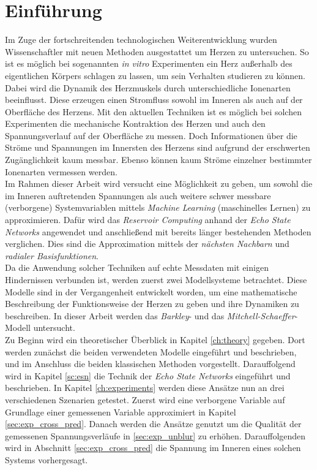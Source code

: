 \chapter{Einführung}



Im Zuge der fortschreitenden technologischen Weiterentwicklung wurden Wissenschaftler mit neuen Methoden ausgestattet um Herzen zu untersuchen. So ist es möglich bei sogenannten \textit{in vitro} Experimenten ein Herz außerhalb des eigentlichen Körpers schlagen zu lassen, um sein Verhalten studieren zu können. Dabei wird die Dynamik des Herzmuskels durch unterschiedliche Ionenarten beeinflusst. Diese erzeugen einen Stromfluss sowohl im Inneren als auch auf der Oberfläche des Herzens. Mit den aktuellen Techniken ist es möglich bei solchen Experimenten die mechanische Kontraktion des Herzen und auch den Spannungsverlauf auf der Oberfläche zu messen. Doch Informationen über die Ströme und Spannungen im Innersten des Herzens sind aufgrund der erschwerten Zugänglichkeit kaum messbar. Ebenso können kaum Ströme einzelner bestimmter Ionenarten vermessen werden. \\

Im Rahmen dieser Arbeit wird versucht eine Möglichkeit zu geben, um sowohl die im Inneren auftretenden Spannungen als auch weitere schwer messbare (verborgene) Systemvariablen mittels \textit{Machine Learning} (maschinelles Lernen) zu approximieren. Dafür wird das \textit{Reservoir Computing} anhand der \textit{Echo State Networks} angewendet und anschließend mit bereits länger bestehenden Methoden verglichen. Dies sind die Approximation mittels der \textit{nächsten Nachbarn} und \textit{radialer Basisfunktionen}.\\
  
Da die Anwendung solcher Techniken auf echte Messdaten mit einigen Hindernissen verbunden ist, werden zuerst zwei Modellsysteme betrachtet. Diese Modelle sind in der Vergangenheit entwickelt worden, um eine mathematische Beschreibung der Funktionsweise der Herzen zu geben und ihre Dynamiken zu beschreiben. In dieser Arbeit werden das \textit{Barkley}- und das \textit{Mitchell-Schaeffer}-Modell untersucht. \\

Zu Beginn wird ein theoretischer Überblick in Kapitel \ref{ch:theory} gegeben. Dort werden zunächst die beiden verwendeten Modelle eingeführt und beschrieben, und im Anschluss die beiden klassischen Methoden vorgestellt. Darauffolgend wird in Kapitel \ref{sc:esn} die Technik der \textit{Echo State Networks} eingeführt und beschrieben. In Kapitel \ref{ch:experiments} werden diese Ansätze nun an drei verschiedenen Szenarien getestet. Zuerst wird eine verborgene Variable auf Grundlage einer gemessenen Variable approximiert in Kapitel \ref{sec:exp_cross_pred}. Danach werden die Ansätze genutzt um die Qualität der gemessenen Spannungsverläufe in \ref{sec:exp_unblur} zu erhöhen. Darauffolgenden wird in Abschnitt \ref{sec:exp_cross_pred} die Spannung im Inneren eines solchen Systems vorhergesagt.\\

